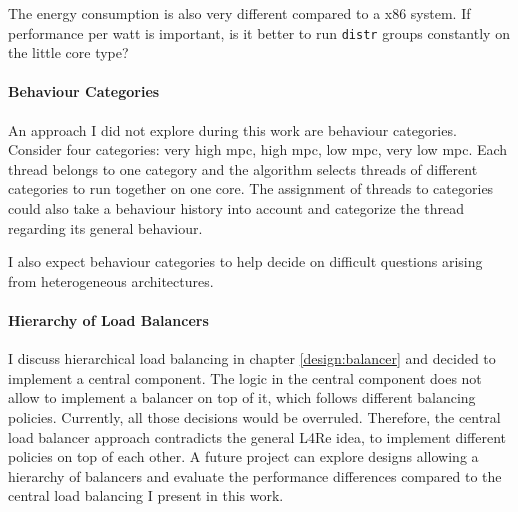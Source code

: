 The energy consumption is also very different compared to a x86 system.
If performance per watt is important, is it better to run \texttt{distr} groups
constantly on the little core type?


\paragraph{Behaviour Categories}
An approach I did not explore during this work are behaviour categories.
Consider four categories: very high \gls{mpc}, high \gls{mpc}, low \gls{mpc},
very low \gls{mpc}.
Each thread belongs to one category and the algorithm selects threads of
different categories to run together on one core.
The assignment of threads to categories could also take a behaviour history
into account and categorize the thread regarding its general behaviour.

I also expect behaviour categories to help decide on difficult questions
arising from heterogeneous architectures.

\paragraph{Hierarchy of Load Balancers}
I discuss hierarchical load balancing in chapter \ref{design:balancer} and
decided to implement a central component.
The logic in the central component does not allow to implement a
balancer on top of it, which follows different balancing policies.
Currently, all those decisions would be overruled.
Therefore, the central load balancer approach contradicts the general L4Re
idea, to implement different policies on top of each other.
A future project can explore designs allowing a hierarchy of balancers and
evaluate the performance differences compared to the central load balancing I
present in this work.

\begin{comment}
\paragraph{Workload-aware balancing}
The modular approach allows quick replacement and testing of different
algorithms in the various components.
If very specific workloads run on the system, tuned balancing algorithms for
this specific workload can be used to increase the performance of the system.
\end{comment}


\cleardoublepage

